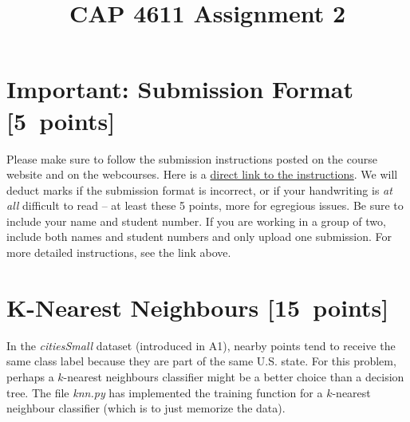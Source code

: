 \documentclass{article}
\newcommand{\blu}[1]{{\textcolor{blu}{#1}}}
\let\ask\blu
\newcommand\pts[1]{\textcolor{pointscolour}{[#1~points]}}
\begin{document}
    \title{CAP 4611 Assignment 2}
    \author{}
    \date{}
    \maketitle
    \vspace{-4em}


    \section*{Important: Submission Format \pts{5}}

    Please make sure to follow the submission instructions posted on the
    course website and on the webcourses. Here is a \href{https://www.dropbox.com/scl/fi/gpwv8s5b6xx16cepm1bn9/submission_instructions.pdf?rlkey=m3l066bopj9bu1l9m53rbcucs&raw=1}{direct link to the instructions}.
    \ask{We will deduct marks if the submission format is incorrect, or
    if your handwriting is \emph{at all} difficult to read} -- at least
    these 5 points, more for egregious issues. Be sure to include your
    name and student number. If you are working in a group of two,
    include both names and student numbers and only upload one
    submission. For more detailed instructions, see the link above.

    \section{K-Nearest Neighbours \pts{15}}

    In the \emph{citiesSmall} dataset (introduced in A1), nearby points tend to receive the same class label because they are part of the same U.S. state. For this problem, perhaps a $k$-nearest neighbours classifier might be a better choice than a decision tree. The file \emph{knn.py} has implemented the training function for a $k$-nearest neighbour classifier (which is to just memorize the data).
\end{document}
